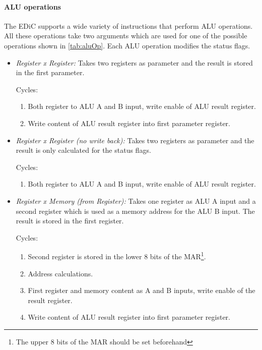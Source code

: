\paragraph{\gls{ALU} operations}
The \gls{EDiC} supports a wide variety of instructions that perform \gls{ALU} operations.
All these operations take two arguments which are used for one of the possible operations shown in \cref{tab:aluOp}.
Each \gls{ALU} operation modifies the status flags.
\begin{itemize}
  \item \emph{Register x Register:} Takes two registers as parameter and the result is stored in the first parameter.

  Cycles:
  \begin{enumerate}
    \item Both register to \gls{ALU} A and B input, write enable of \gls{ALU} result register.
    \item Write content of \gls{ALU} result register into first parameter register.
  \end{enumerate}

  \item \emph{Register x Register (no write back):} Takes two registers as parameter and the result is only calculated for the status flags.

  Cycles:
  \begin{enumerate}
    \item Both register to \gls{ALU} A and B input, write enable of \gls{ALU} result register.
  \end{enumerate}

  \item \emph{Register x Memory (from Register):} Takes one register as \gls{ALU} A input and a second register which is used as a memory address for the \gls{ALU} B input.
  The result is stored in the first register.

  Cycles:
  \begin{enumerate}
    \item Second register is stored in the lower 8 bits of the \gls{MAR}\footnote{The upper 8 bits of the \gls{MAR} should be set beforehand}.
    \item Address calculations.
    \item First register and memory content as A and B inputs, write enable of the result register.
    \item Write content of \gls{ALU} result register into first parameter register.
  \end{enumerate}


\end{itemize}
